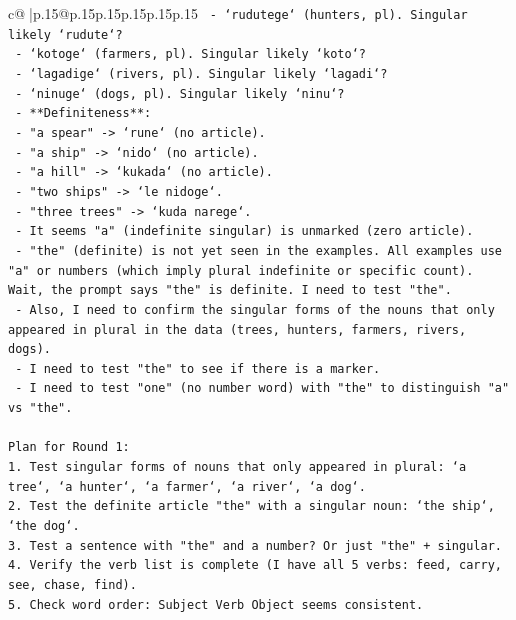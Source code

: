 \documentclass{article}
\begin{document}
{\begin{supertabular}{c@{$\;$}|p{.15\linewidth}@{}p{.15\linewidth}p{.15\linewidth}p{.15\linewidth}p{.15\linewidth}p{.15\linewidth}}
{{{\texttt{    {-} `rudutege` (hunters, pl). Singular likely `rudute`?} \\
\texttt{    {-} `kotoge` (farmers, pl). Singular likely `koto`?} \\
\texttt{    {-} `lagadige` (rivers, pl). Singular likely `lagadi`?} \\
\texttt{    {-} `ninuge` (dogs, pl). Singular likely `ninu`?} \\
\texttt{  {-} **Definiteness**:} \\
\texttt{    {-} "a spear" {-}> `rune` (no article).} \\
\texttt{    {-} "a ship" {-}> `nido` (no article).} \\
\texttt{    {-} "a hill" {-}> `kukada` (no article).} \\
\texttt{    {-} "two ships" {-}> `le nidoge`.} \\
\texttt{    {-} "three trees" {-}> `kuda narege`.} \\
\texttt{    {-} It seems "a" (indefinite singular) is unmarked (zero article).} \\
\texttt{    {-} "the" (definite) is not yet seen in the examples. All examples use "a" or numbers (which imply plural indefinite or specific count). Wait, the prompt says "the" is definite. I need to test "the".} \\
\texttt{    {-} Also, I need to confirm the singular forms of the nouns that only appeared in plural in the data (trees, hunters, farmers, rivers, dogs).} \\
\texttt{    {-} I need to test "the" to see if there is a marker.} \\
\texttt{    {-} I need to test "one" (no number word) with "the" to distinguish "a" vs "the".} \\
\\ 
\texttt{Plan for Round 1:} \\
\texttt{1. Test singular forms of nouns that only appeared in plural: `a tree`, `a hunter`, `a farmer`, `a river`, `a dog`.} \\
\texttt{2. Test the definite article "the" with a singular noun: `the ship`, `the dog`.} \\
\texttt{3. Test a sentence with "the" and a number? Or just "the" + singular.} \\
\texttt{4. Verify the verb list is complete (I have all 5 verbs: feed, carry, see, chase, find).} \\
\texttt{5. Check word order: Subject Verb Object seems consistent.} \\
\\ 
}}}
\end{supertabular}}
\end{document}
